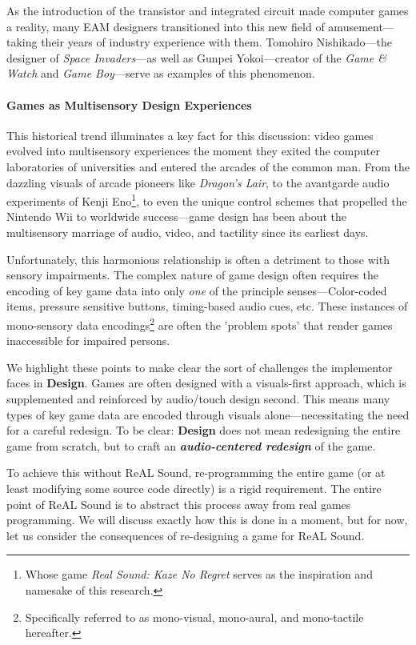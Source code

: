 \documentclass{report}
\newcommand{\rs}{ReAL Sound\xspace}
\newcommand{\design}{\textbf{Design}\xspace}
\newcommand{\imp}{implementor\xspace}
\begin{document}
As the introduction of the transistor and integrated circuit made computer games a reality, many EAM designers transitioned into this new field of amusement---taking their years of industry experience with them. Tomohiro Nishikado---the designer of \emph{Space Invaders}---as well as Gunpei Yokoi---creator of the \emph{Game \& Watch} and \emph{Game Boy}---serve as examples of this phenomenon\cite{theycreateworlds}.

\paragraph{Games as Multisensory Design Experiences}

This historical trend illuminates a key fact for this discussion: video games evolved into multisensory experiences the moment they exited the computer laboratories of universities and entered the arcades of the common man. From the dazzling visuals of arcade pioneers like \emph{Dragon's Lair}, to the avantgarde audio experiments of Kenji Eno\footnote{Whose game \emph{Real Sound: Kaze No Regret} serves as the inspiration and namesake of this research.}, to even the unique control schemes that propelled the Nintendo Wii to worldwide success---game design has been about the multisensory marriage of audio, video, and tactility since its earliest days.

Unfortunately, this harmonious relationship is often a detriment to those with sensory impairments. The complex nature of game design often requires the encoding of key game data into only \emph{one} of the principle senses---Color-coded items, pressure sensitive buttons, timing-based audio cues, etc. These instances of mono-sensory data encodings\footnote{Specifically referred to as mono-visual, mono-aural, and mono-tactile hereafter.} are often the 'problem spots' that render games inaccessible for impaired persons.


We highlight these points to make clear the sort of challenges the \imp faces in \design. Games are often designed with a visuals-first approach, which is supplemented and reinforced by audio/touch design second. This means many types of key game data are encoded through visuals alone---necessitating the need for a careful redesign. To be clear: \design does not mean redesigning the entire game from scratch, but to craft an \emph{\textbf{audio-centered redesign}} of the game.

To achieve this without \rs, re-programming the entire game (or at least modifying some source code directly) is a rigid requirement. The entire point of \rs is to abstract this process away from real games programming. We will discuss exactly how this is done in a moment, but for now, let us consider the consequences of re-designing a game for \rs. 
\end{document}
